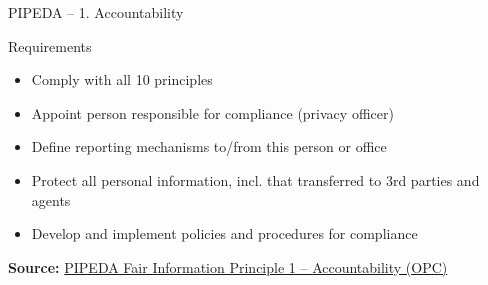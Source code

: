 \documentclass[ignorenonframetext,xcolor=x11names]{beamer}
\begin{document}
\begin{frame}{PIPEDA -- 1. Accountability}
\begin{block}{Requirements}
  \begin{itemize}
     \item Comply with all 10 principles
     \item Appoint person responsible for compliance (privacy officer)
     \item Define reporting mechanisms to/from this person or office
     \item Protect all personal information, incl. that transferred to 3rd parties and agents
     \item Develop and implement policies and procedures for compliance
  \end{itemize}
\end{block}

\vspace{\baselineskip}
\scriptsize \textbf{Source:} \href{https://www.priv.gc.ca/en/privacy-topics/privacy-laws-in-canada/the-personal-information-protection-and-electronic-documents-act-pipeda/p_principle/principles/p_accountability/}{PIPEDA Fair Information Principle 1 -- Accountability (OPC)}
\end{frame}
\end{document}
